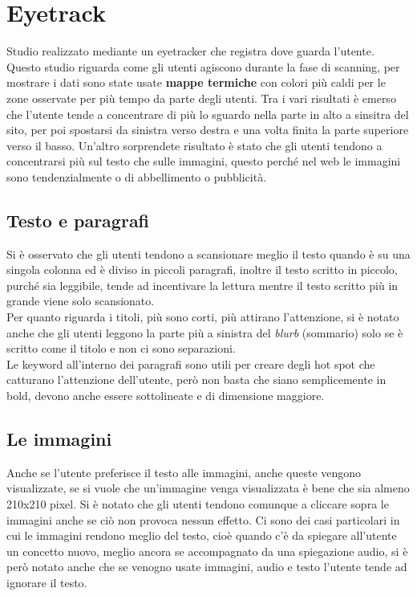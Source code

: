 \section{Eyetrack}
Studio realizzato mediante un eyetracker che registra dove guarda l'utente. Questo studio riguarda come gli utenti agiscono durante la fase di scanning, per mostrare i dati sono state usate \textbf{mappe termiche} con colori più caldi per le zone osservate per più tempo da parte degli utenti.
Tra i vari risultati è emerso che l'utente tende a concentrare di più lo sguardo nella parte in alto a sinsitra del sito, per poi spostarsi da sinistra verso destra e una volta finita la parte superiore verso il basso.
Un'altro sorprendete risultato è stato che gli utenti tendono a concentrarsi più sul testo che sulle immagini, questo perché nel web le immagini sono tendenzialmente o di abbellimento o pubblicità.

\subsection{Testo e paragrafi}
Si è osservato che gli utenti tendono a scansionare meglio il testo quando è su una singola colonna ed è diviso in piccoli paragrafi, inoltre il testo scritto in piccolo, purché sia leggibile, tende ad incentivare la lettura mentre il testo scritto più in grande viene solo scansionato. \\
Per quanto riguarda i titoli, più sono corti, più attirano l'attenzione, si è notato anche che gli utenti leggono la parte più a sinistra del \textit{blurb} (sommario) solo se è scritto come il titolo e non ci sono separazioni.	\\
Le keyword all'interno dei paragrafi sono utili per creare degli hot spot che catturano l'attenzione dell'utente, però non basta che siano semplicemente in bold, devono anche essere sottolineate e di dimensione maggiore.

\subsection{Le immagini}
Anche se l'utente preferisce il testo alle immagini, anche queste vengono visualizzate, se si vuole che un'immagine venga visualizzata è bene che sia almeno 210x210 pixel.
Si è notato che gli utenti tendono comunque a cliccare sopra le immagini anche se ciò non provoca nessun effetto.
Ci sono dei casi particolari in cui le immagini rendono meglio del testo, cioè quando c'è da spiegare all'utente un concetto nuovo, meglio ancora se accompagnato da una spiegazione audio, si è però notato anche che se venogno usate immagini, audio e testo l'utente tende ad ignorare il testo.

